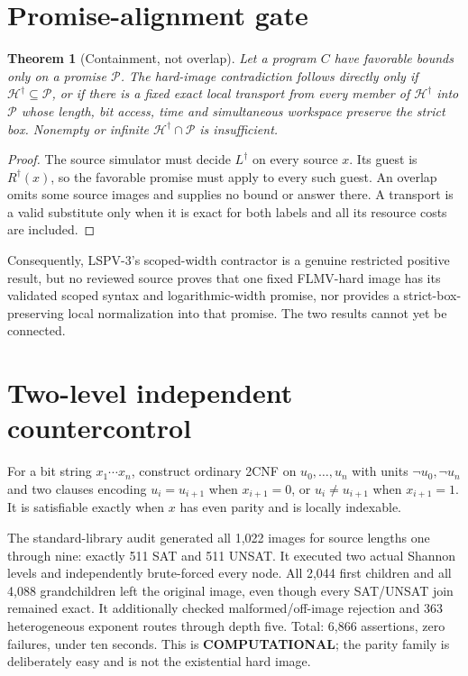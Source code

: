 \documentclass[11pt]{article}
\newtheorem{theorem}{Theorem}
\begin{document}
\section{Promise-alignment gate}
\begin{theorem}[Containment, not overlap]
Let a program $C$ have favorable bounds only on a promise $\mathcal P$.  The
hard-image contradiction follows directly only if
$\mathcal H^\dagger\subseteq\mathcal P$, or if there is a fixed exact local
transport from every member of $\mathcal H^\dagger$ into $\mathcal P$ whose
length, bit access, time and simultaneous workspace preserve the strict box.
Nonempty or infinite $\mathcal H^\dagger\cap\mathcal P$ is insufficient.
\end{theorem}
\begin{proof}
The source simulator must decide $L^\dagger$ on every source $x$.  Its guest is
$R^\dagger(x)$, so the favorable promise must apply to every such guest.  An
overlap omits some source images and supplies no bound or answer there.  A
transport is a valid substitute only when it is exact for both labels and all
its resource costs are included.
\end{proof}

Consequently, LSPV-3's scoped-width contractor is a genuine restricted
positive result, but no reviewed source proves that one fixed FLMV-hard image
has its validated scoped syntax and logarithmic-width promise, nor provides a
strict-box-preserving local normalization into that promise.  The two results
cannot yet be connected.

\section{Two-level independent countercontrol}
For a bit string $x_1\cdots x_n$, construct ordinary 2CNF on
$u_0,\ldots,u_n$ with units $\neg u_0,\neg u_n$ and two clauses encoding
$u_i=u_{i+1}$ when $x_{i+1}=0$, or $u_i\ne u_{i+1}$ when $x_{i+1}=1$.
It is satisfiable exactly when $x$ has even parity and is locally indexable.

The standard-library audit generated all 1,022 images for source lengths one
through nine: exactly 511 SAT and 511 UNSAT.  It executed two actual Shannon
levels and independently brute-forced every node.  All 2,044 first children and
all 4,088 grandchildren left the original image, even though every SAT/UNSAT
join remained exact.  It additionally checked malformed/off-image rejection
and 363 heterogeneous exponent routes through depth five.  Total: 6,866
assertions, zero failures, under ten seconds.  This is
\textbf{COMPUTATIONAL}; the parity family is deliberately easy and is not the
existential hard image.
\end{document}
